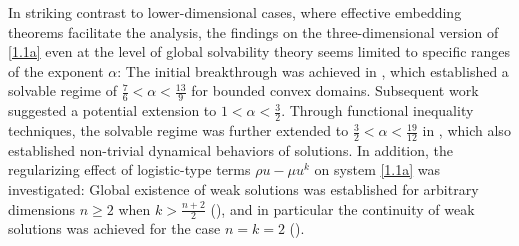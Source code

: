 \documentclass[12pt]{article}
\theoremstyle{plain}
\theoremstyle{definition}
\numberwithin{equation}{section}
\begin{document}
   In striking contrast to lower-dimensional cases, where effective embedding theorems facilitate the analysis,
    the findings on the three-dimensional version of \eqref{1.1a}  even at the level of global solvability theory seems  limited to %
   specific ranges of the exponent
    $\alpha$:   %
The initial breakthrough was achieved in \cite{LiJDE}, which established a solvable regime of
 $\frac{7}{6} < \alpha < \frac{13}{9}$ for bounded convex domains.  Subsequent work \cite{Wu}
   suggested a potential extension to
   $1 < \alpha < \frac{3}{2}$.
Through functional inequality techniques, the solvable regime was further extended to $\frac{3}{2} < \alpha < \frac{19}{12}$ in \cite{XiangMao}, which also established non-trivial dynamical behaviors of solutions.
 In addition, the regularizing effect of
  logistic-type terms $\rho u-\mu u^k$ on
 system \eqref{1.1a} was investigated:
 Global existence of weak solutions was established for arbitrary dimensions $n\geq2$ when $k>\frac{n+2}{2}$ (\cite{XP}), and in particular  the continuity of weak solutions was achieved  for the case $n=k=2$ (\cite{LiWinkler2}).
\end{document}
